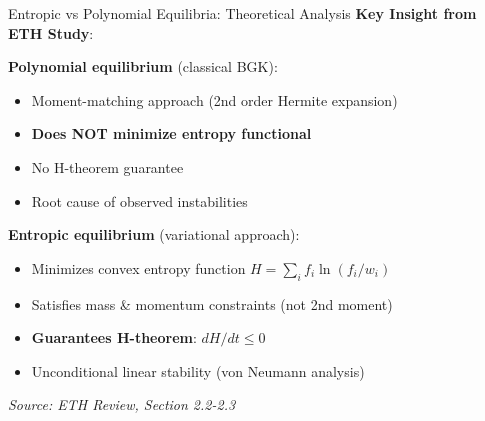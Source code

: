 \documentclass[aspectratio=169]{beamer}
\begin{document}
\begin{frame}{Entropic vs Polynomial Equilibria: Theoretical Analysis}
\textbf{Key Insight from ETH Study}:

\vspace{0.3cm}
\textbf{Polynomial equilibrium} (classical BGK):
\begin{itemize}
    \item Moment-matching approach (2nd order Hermite expansion)
    \item \textbf{Does NOT minimize entropy functional}
    \item No H-theorem guarantee
    \item Root cause of observed instabilities
\end{itemize}

\vspace{0.3cm}
\textbf{Entropic equilibrium} (variational approach):
\begin{itemize}
    \item Minimizes convex entropy function $H = \sum_i f_i \ln(f_i/w_i)$
    \item Satisfies mass \& momentum constraints (not 2nd moment)
    \item \textbf{Guarantees H-theorem}: $dH/dt \leq 0$
    \item Unconditional linear stability (von Neumann analysis)
\end{itemize}

\vspace{0.2cm}
\textit{Source: ETH Review, Section 2.2-2.3}
\end{frame}
\end{document}
